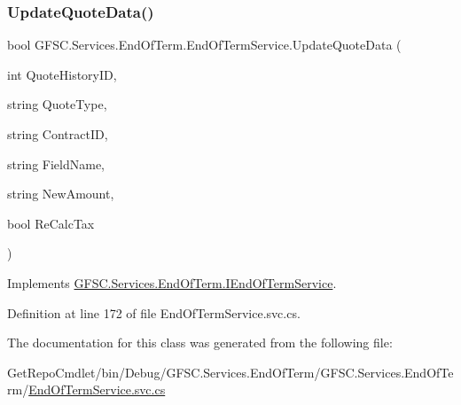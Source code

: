 \subsubsection{\texorpdfstring{Update\+Quote\+Data()}{UpdateQuoteData()}}
{\footnotesize\ttfamily bool G\+F\+S\+C.\+Services.\+End\+Of\+Term.\+End\+Of\+Term\+Service.\+Update\+Quote\+Data (\begin{DoxyParamCaption}\item[{int}]{Quote\+History\+ID,  }\item[{string}]{Quote\+Type,  }\item[{string}]{Contract\+ID,  }\item[{string}]{Field\+Name,  }\item[{string}]{New\+Amount,  }\item[{bool}]{Re\+Calc\+Tax }\end{DoxyParamCaption})}



Implements \mbox{\hyperlink{interface_g_f_s_c_1_1_services_1_1_end_of_term_1_1_i_end_of_term_service_aceeb0be19b43bf22aa06d2428aa4a580}{G\+F\+S\+C.\+Services.\+End\+Of\+Term.\+I\+End\+Of\+Term\+Service}}.



Definition at line 172 of file End\+Of\+Term\+Service.\+svc.\+cs.



The documentation for this class was generated from the following file\+:\begin{DoxyCompactItemize}
\item 
Get\+Repo\+Cmdlet/bin/\+Debug/\+G\+F\+S\+C.\+Services.\+End\+Of\+Term/\+G\+F\+S\+C.\+Services.\+End\+Of\+Term/\mbox{\hyperlink{_end_of_term_service_8svc_8cs}{End\+Of\+Term\+Service.\+svc.\+cs}}\end{DoxyCompactItemize}
